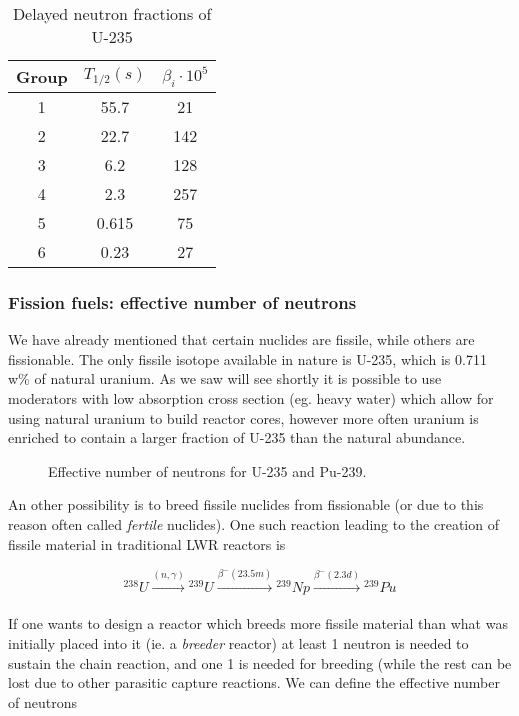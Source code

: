 \begin{table}\caption{Delayed neutron fractions of U-235}
\centering\begin{tabular}{c | c | c}
Group & $T_{1/2} (s)$ & $\beta_i\cdot 10^5$ \\
\hline
1 & 55.7 & 21 \\
2 & 22.7 & 142 \\
3 & 6.2 & 128 \\
4 & 2.3 & 257 \\
5 & 0.615 & 75 \\
6 & 0.23 & 27 
\end{tabular}
\end{table}

\subsubsection*{Fission fuels: effective number of neutrons}

We have already mentioned that certain nuclides are fissile, while others are fissionable. The only fissile isotope available in nature is U-235, which is 0.711 w\% of natural uranium. As we saw will see shortly it is possible to use moderators with low absorption cross section (eg. heavy water) which allow for using natural uranium to build reactor cores, however more often uranium is enriched to contain a larger fraction of U-235 than the natural abundance.

\begin{figure}[ht!]
\protect {}\protect
\caption{\label{fig:eta} \footnotesize{Effective number of neutrons for U-235 and Pu-239.}}
\end{figure}

An other possibility is to breed fissile nuclides from fissionable (or due to this reason often called \textit{fertile} nuclides). One such reaction leading to the creation of fissile material in traditional LWR reactors is

\begin{equation}
{}^{238}U\xrightarrow[]{(n,\gamma)}{}^{239}U\xrightarrow[]{\beta^-(23.5m)}{}^{239}Np\xrightarrow[]{\beta^-(2.3d)} {}^{239}Pu
\end{equation}

If one wants to design a reactor which breeds more fissile material than what was initially placed into it (ie. a \textit{breeder} reactor) at least 1 neutron is needed to sustain the chain reaction, and one 1 is needed for breeding (while the rest can be lost due to other parasitic capture reactions. We can define the effective number of neutrons

